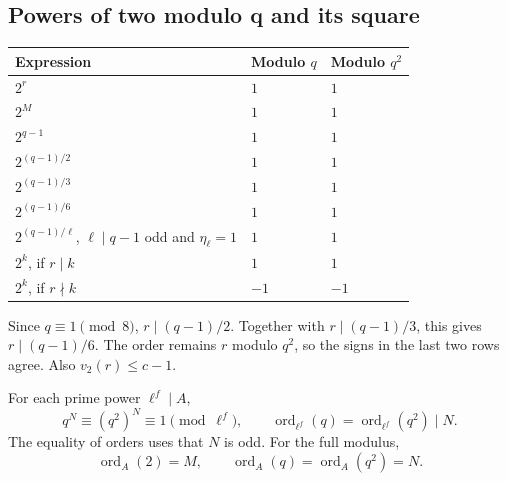 \documentclass[11pt]{article}
\begin{document}
\clearpage
\subsection{Powers of two modulo q and its square}
{\small\renewcommand{\arraystretch}{1.2}
\begin{longtable}{@{}p{}p{}p{}@{}}
\textbf{Expression}&\textbf{Modulo $q$}&\textbf{Modulo $q^2$}\\\hline
\endhead
$2^r$&$1$&$1$\\
$2^M$&$1$&$1$\\
$2^{q-1}$&$1$&$1$\\
$2^{(q-1)/2}$&$1$&$1$\\
$2^{(q-1)/3}$&$1$&$1$\\
$2^{(q-1)/6}$&$1$&$1$\\
$2^{(q-1)/\ell}$, $\ell\mid q-1$ odd and $\eta_\ell=1$&$1$&$1$\\
$2^k$, if $r\mid k$&$1$&$1$\\
$2^k$, if $r\nmid k$&$-1$&$-1$\\\hline
\end{longtable}}
Since $q\equiv1\pmod8$, $r\mid(q-1)/2$. Together with
$r\mid(q-1)/3$, this gives $r\mid(q-1)/6$.
The order remains $r$ modulo $q^2$, so the signs in the last two
rows agree. Also $v_2(r)\le c-1$.

For each prime power $\ell^f\mid A$,
\[
q^N\equiv(q^2)^N\equiv1\pmod{\ell^f},\qquad
\operatorname{ord}_{\ell^f}(q)
=\operatorname{ord}_{\ell^f}(q^2)\mid N.
\]
The equality of orders uses that $N$ is odd. For the full modulus,
\[
\operatorname{ord}_A(2)=M,\qquad
\operatorname{ord}_A(q)=\operatorname{ord}_A(q^2)=N.
\]
\end{document}
